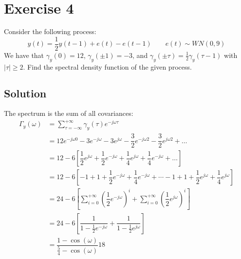 \section{Exercise 4}

Consider the following process:
\[y(t)=\dfrac{1}{2}y(t-1)+e(t)-e(t-1) \qquad e(t)\sim WN(0,9)\]
We have that $\gamma_y(0)=12$, $\gamma_y(\pm 1)=-3$, and $\gamma_y(\pm\tau)=\frac{1}{2}\gamma_y(\tau-1)$ with $\left\lvert \tau \right\rvert  \geq 2$. 
Find the spectral density function of the given process.

\subsection*{Solution}
The spectrum is the sum of all covariances:
\begin{align*}
    \Gamma_y(\omega)    &=\sum_{\tau=-\infty}^{+\infty}\gamma_y(\tau)e^{-j\omega\tau} \\
                        &=12e^{-j\omega 0}-3e^{-j\omega}-3e^{j\omega}-\dfrac{3}{2}e^{-j\omega 2}-\dfrac{3}{2}e^{j\omega 2}+\dots \\
                        &= 12-6\left[\dfrac{1}{2}e^{j\omega}+\dfrac{1}{2}e^{-j\omega}+\dfrac{1}{4}e^{j\omega}+\dfrac{1}{4}e^{-j\omega}+\dots \right] \\
                        &= 12-6\left[-1+1+\dfrac{1}{2}e^{-j\omega}+\dfrac{1}{4}e^{-j\omega}+\cdots-1+1+\dfrac{1}{2}e^{j\omega}+\dfrac{1}{4}e^{j\omega} \right] \\  
                        &= 24-6\left[\sum_{i=0}^{+\infty}{\left(\dfrac{1}{2}e^{-j\omega}\right)}^i+ \sum_{i=0}^{+\infty}{\left(\dfrac{1}{2}e^{j\omega}\right)}^i\right] \\  
                        &= 24-6\left[\dfrac{1}{1-\frac{1}{2}e^{-j\omega}}+ \dfrac{1}{1-\frac{1}{2}e^{j\omega}}\right] \\        
                        &=\dfrac{1-\cos(\omega)}{\frac{5}{4}-\cos(\omega)}18
\end{align*}